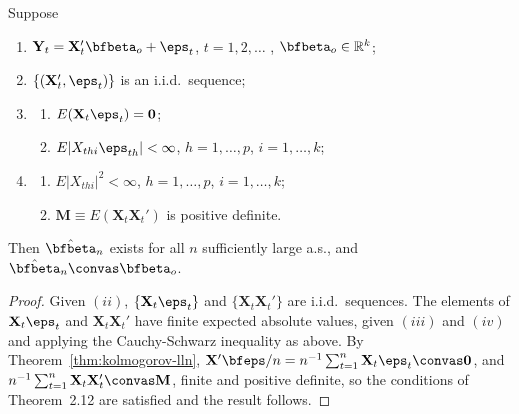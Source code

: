\begin{theorem}\label{thm:ols-iid}
Suppose
\begin{enumerate}[label=(\roman*)]
\item $\mathbf{Y}_t = \mathbf{X}_t' \bfbeta_o + \eps_t$, \quad $t = 1, 2, \ldots$ , $\bfbeta_o \in \mathbb{R}^k$;
\item $\{(\mathbf{X}_t', \eps_t)\}$ is an i.i.d.\ sequence;
\item \begin{enumerate}[label=(\alph*)]
\item $E(\mathbf{X}_t \eps_t) = \mathbf{0}$;
\item $E|X_{thi} \eps_{th}| < \infty$, $h = 1, \ldots, p$, $i = 1, \ldots, k$;
\end{enumerate}
\item \begin{enumerate}[label=(\alph*)]
\item $E|X_{thi}|^2 < \infty$, $h = 1, \ldots, p$, $i = 1, \ldots, k$;
\item $\mathbf{M} \equiv E(\mathbf{X}_t \mathbf{X}_t')$ is positive definite.
\end{enumerate}
\end{enumerate}
Then $\hat{\bfbeta}_n$ exists for all $n$ sufficiently large a.s., and $\hat{\bfbeta}_n \convas \bfbeta_o$.
\end{theorem}

\begin{proof}
Given $(ii)$, $\{\mathbf{X}_t \eps_t\}$ and $\{\mathbf{X}_t \mathbf{X}_t'\}$ are i.i.d.\ sequences. The elements of $\mathbf{X}_t \eps_t$ and $\mathbf{X}_t \mathbf{X}_t'$ have finite expected absolute values, given $(iii)$ and $(iv)$ and applying the Cauchy-Schwarz inequality as above. By Theorem~\ref{thm:kolmogorov-lln}, $\mathbf{X}'\bfeps/n = n^{-1} \sum_{t=1}^{n} \mathbf{X}_t \eps_t \convas \mathbf{0}$, and $n^{-1} \sum_{t=1}^{n} \mathbf{X}_t \mathbf{X}_t' \convas \mathbf{M}$, finite and positive definite, so the conditions of Theorem~2.12 are satisfied and the result follows. \qedhere
\end{proof}

